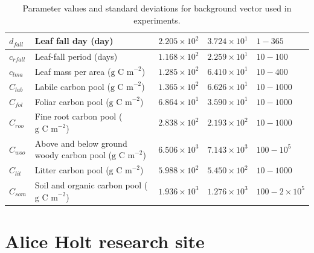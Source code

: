 \begin{table}[ht]
\begin{center}
\begin{tabular}{| l | p{4.5cm} | p{1.7cm} | p{1.7cm} | p{1.7cm} |}
$d_{fall}$ & Leaf fall day (day) & $2.205\times 10^{2}$ & $3.724\times 10^{1}$ & $1 - 365$ \\ \hline
$c_{rfall}$ & Leaf-fall period (days) & $1.168\times 10^{2}$ & $2.259\times 10^{1}$ & $10 - 100$ \\ \hline
$c_{lma}$ & Leaf mass per area ($\text{g C m}^{-2}$) & $1.285\times 10^{2}$ & $6.410\times 10^{1}$ & $10 - 400$ \\ \hline
$C_{lab}$ & Labile carbon pool ($\text{g C m}^{-2}$) & $1.365\times 10^{2}$ & $6.626\times 10^{1}$ & $10 - 1000$ \\ \hline
$C_{fol}$ & Foliar carbon pool ($\text{g C m}^{-2}$) & $6.864\times 10^{1}$ & $3.590\times 10^{1}$ & $10 - 1000$ \\ \hline
$C_{roo}$ & Fine root carbon pool ($\text{g C m}^{-2}$) & $2.838\times 10^{2}$ & $2.193\times 10^{2}$ & $10 - 1000$ \\ \hline
$C_{woo}$ & Above and below ground woody carbon pool ($\text{g C m}^{-2}$) & $6.506\times 10^{3}$ & $7.143\times 10^{3}$ & $100 - 10^{5}$ \\ \hline
$C_{lit}$ & Litter carbon pool ($\text{g C m}^{-2}$) & $5.988\times 10^{2}$ & $5.450\times 10^{2}$ & $10 - 1000$ \\ \hline
$C_{som}$ & Soil and organic carbon pool ($\text{g C m}^{-2}$) & $1.936\times 10^{3}$ & $1.276\times 10^{3}$ & $100 - 2 \times 10^{5}$  \\ \hline
	\end{tabular}
	\caption{Parameter values and standard deviations for background vector used in experiments.}
	\label{chap5:table:xbvars}
\end{center} 
\end{table}


\section{Alice Holt research site} \label{chap4:sec:aliceholt}

